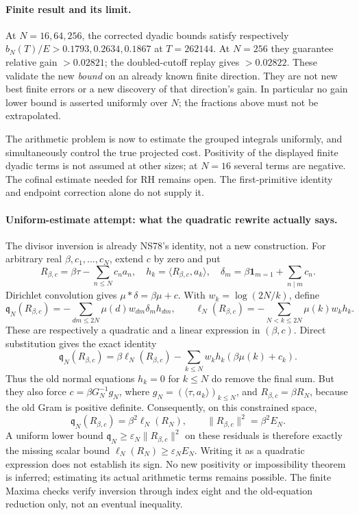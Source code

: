 \paragraph{Finite result and its limit.}
At $N=16,64,256$, the corrected dyadic bounds satisfy respectively
$b_N(T)/E>0.1793,0.2634,0.1867$ at $T=262144$.
At $N=256$ they guarantee relative gain $>0.02821$; the doubled-cutoff
replay gives $>0.02822$. These validate the new \emph{bound} on an already
known finite direction. They are not new best finite errors or a new
discovery of that direction's gain. In particular no gain lower bound is
asserted uniformly over $N$; the fractions above must not be extrapolated.

The arithmetic problem is now to estimate the grouped integrals uniformly,
and simultaneously control the true projected cost. Positivity of the
displayed finite dyadic terms is not assumed at other sizes; at $N=16$
several terms are negative. The cofinal estimate needed for RH remains
open. The first-primitive identity and endpoint correction alone do not
supply it.

\paragraph{Uniform-estimate attempt: what the quadratic rewrite actually says.}
The divisor inversion is already NS78's identity, not a new construction.
For arbitrary real $\beta,c_1,\ldots,c_N$, extend $c$ by zero and put
\[
 R_{\beta,c}=\beta\tau-\sum_{n\le N}c_na_n,\quad
 h_k=\langle R_{\beta,c},a_k\rangle,\quad
 \delta_m=\beta\mathbf1_{m=1}+\sum_{n\mid m}c_n.
\]
Dirichlet convolution gives $\mu*\delta=\beta\mu+c$.
With $w_k=\log(2N/k)$, define
\[
 \mathfrak q_N(R_{\beta,c})
 =-\sum_{dm\le2N}\mu(d)w_{dm}\delta_m h_{dm},\qquad
 \ell_N(R_{\beta,c})=-\sum_{N<k\le2N}\mu(k)w_k h_k.
\]
These are respectively a quadratic and a linear expression in
$(\beta,c)$. Direct substitution gives the exact identity
\[
 \mathfrak q_N(R_{\beta,c})=\beta\ell_N(R_{\beta,c})
 -\sum_{k\le N}w_k h_k(\beta\mu(k)+c_k).
\]
Thus the old normal equations $h_k=0$ for $k\le N$ do remove the final
sum. But they also force $c=\beta G_N^{-1}g_N$, where
$g_N=(\langle\tau,a_k\rangle)_{k\le N}$, and
$R_{\beta,c}=\beta R_N$, because the old Gram is positive definite.
Consequently, on this constrained space,
\[
 \mathfrak q_N(R_{\beta,c})=\beta^2\ell_N(R_N),\qquad
 \|R_{\beta,c}\|^2=\beta^2 E_N.
\]
A uniform lower bound $\mathfrak q_N\ge\varepsilon_N\|R_{\beta,c}\|^2$
on these residuals is therefore exactly the missing scalar bound
$\ell_N(R_N)\ge\varepsilon_NE_N$. Writing it as a quadratic expression
does not establish its sign. No new positivity or impossibility theorem
is inferred; estimating its actual arithmetic terms remains possible.
The finite Maxima checks verify inversion through index eight and the
old-equation reduction only, not an eventual inequality.

